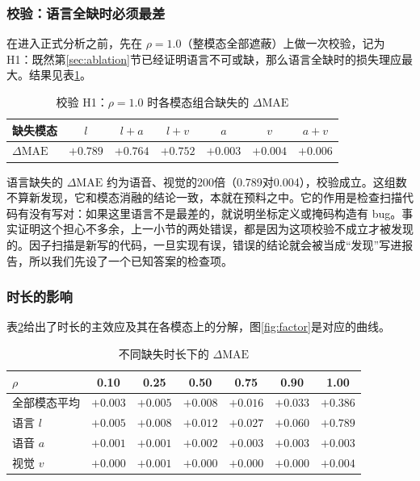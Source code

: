 \subsubsection{校验：语言全缺时必须最差}

在进入正式分析之前，先在 $\rho=1.0$（整模态全部遮蔽）上做一次校验，记为 H1：既然第\ref{sec:ablation}节已经证明语言不可或缺，那么语言全缺时的损失理应最大。结果见表\ref{tab:h1}。

\begin{table}[htbp]
\centering
\caption{校验 H1：$\rho=1.0$ 时各模态组合缺失的 $\Delta\mathrm{MAE}$}
\label{tab:h1}
\begin{tabular}{lcccccc}
\toprule
缺失模态 & $l$ & $l{+}a$ & $l{+}v$ & $a$ & $v$ & $a{+}v$ \\
\midrule
$\Delta\mathrm{MAE}$ & $+0.789$ & $+0.764$ & $+0.752$ & $+0.003$ & $+0.004$ & $+0.006$ \\
\bottomrule
\end{tabular}
\end{table}

语言缺失的 $\Delta\mathrm{MAE}$ 约为语音、视觉的200倍（0.789对0.004），校验成立。这组数不算新发现，它和模态消融的结论一致，本就在预料之中。它的作用是检查扫描代码有没有写对：如果这里语言不是最差的，就说明坐标定义或掩码构造有 bug。事实证明这个担心不多余，上一小节的两处错误，都是因为这项校验不成立才被发现的。因子扫描是新写的代码，一旦实现有误，错误的结论就会被当成“发现”写进报告，所以我们先设了一个已知答案的检查项。

\subsubsection{时长的影响}

表\ref{tab:dur}给出了时长的主效应及其在各模态上的分解，图\ref{fig:factor}是对应的曲线。

\begin{table}[htbp]
\centering
\caption{不同缺失时长下的 $\Delta\mathrm{MAE}$}
\label{tab:dur}
\begin{tabular}{lcccccc}
\toprule
$\rho$ & 0.10 & 0.25 & 0.50 & 0.75 & 0.90 & 1.00 \\
\midrule
全部模态平均 & $+0.003$ & $+0.005$ & $+0.008$ & $+0.016$ & $+0.033$ & $+0.386$ \\
语言 $l$ & $+0.005$ & $+0.008$ & $+0.012$ & $+0.027$ & $+0.060$ & $+0.789$ \\
语音 $a$ & $+0.001$ & $+0.001$ & $+0.002$ & $+0.003$ & $+0.003$ & $+0.003$ \\
视觉 $v$ & $+0.000$ & $+0.001$ & $+0.000$ & $+0.000$ & $+0.000$ & $+0.004$ \\
\bottomrule
\end{tabular}
\end{table}

